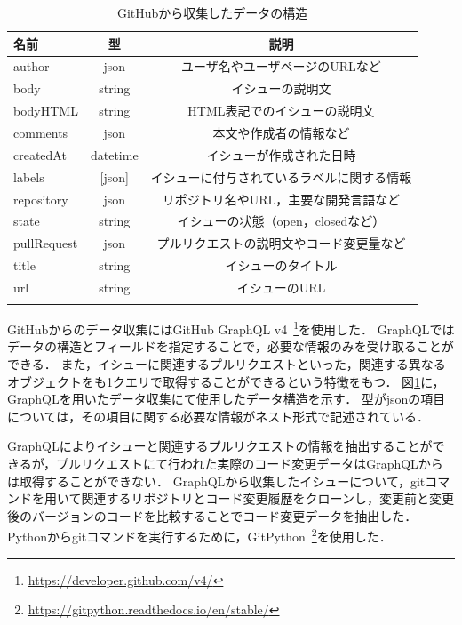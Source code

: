 
\begin{table}[t]

  \centering
  \caption{GitHubから収集したデータの構造}
  \label{table:format_collected_GH_data}
    
  \begin{tabular}{l | c | c } \Xhline{3\arrayrulewidth}
      名前 & 型 & 説明 \\ \hline \hline
      author & json & ユーザ名やユーザページのURLなど\\
      body & string & イシューの説明文  \\
      bodyHTML & string & HTML表記でのイシューの説明文 \\
      comments & json & 本文や作成者の情報など \\
      createdAt & datetime & イシューが作成された日時 \\
      labels & [json] & イシューに付与されているラベルに関する情報 \\
      repository & json & リポジトリ名やURL，主要な開発言語など\\  
      state & string & イシューの状態（open，closedなど） \\
      pullRequest & json & プルリクエストの説明文やコード変更量など \\
      title & string & イシューのタイトル \\
      url & string & イシューのURL \\
      
      \Xhline{3\arrayrulewidth}
  \end{tabular}
\end{table}

GitHubからのデータ収集にはGitHub GraphQL v4~\footnote{\url{https://developer.github.com/v4/}}を使用した．
GraphQLではデータの構造とフィールドを指定することで，必要な情報のみを受け取ることができる．
また，イシューに関連するプルリクエストといった，関連する異なるオブジェクトをも1クエリで取得することができるという特徴をもつ．
図\ref{table:format_collected_GH_data}に，GraphQLを用いたデータ収集にて使用したデータ構造を示す．
型がjsonの項目については，その項目に関する必要な情報がネスト形式で記述されている．

GraphQLによりイシューと関連するプルリクエストの情報を抽出することができるが，プルリクエストにて行われた実際のコード変更データはGraphQLからは取得することができない．
GraphQLから収集したイシューについて，gitコマンドを用いて関連するリポジトリとコード変更履歴をクローンし，変更前と変更後のバージョンのコードを比較することでコード変更データを抽出した．
Pythonからgitコマンドを実行するために，GitPython~\footnote{\url{https://gitpython.readthedocs.io/en/stable/}}を使用した．
  

